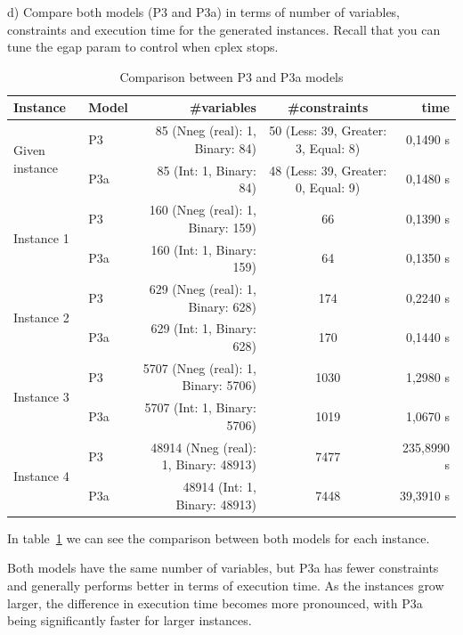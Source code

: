 \documentclass{article}
\begin{document}
\begin{tcolorbox}[colback=gray!10, colframe=gray!50]
d) Compare both models (P3 and P3a) in terms of number of variables, constraints and execution time for the generated instances. Recall that you can tune the egap param to control when cplex stops.
\end{tcolorbox}
\begin{table}[ht]
\centering
\caption{Comparison between P3 and P3a models}
\label{tab:comparation}
\small
\begin{tabular}{l l r c r}
\hline
Instance & Model & \#variables & \#constraints & time \\
\hline
\multirow{2}{*}{Given instance} & P3  & 85 (Nneg (real): 1, Binary: 84)  & 50 (Less: 39, Greater: 3, Equal: 8) & 0,1490 s \\
                                & P3a & 85 (Int: 1, Binary: 84)  & 48 (Less: 39, Greater: 0, Equal: 9) & 0,1480 s \\
\hline
\multirow{2}{*}{Instance 1}     & P3  & 160 (Nneg (real): 1, Binary: 159) & 66 & 0,1390 s \\
                                & P3a & 160 (Int: 1, Binary: 159) & 64 & 0,1350 s \\
\hline
\multirow{2}{*}{Instance 2}     & P3  & 629 (Nneg (real): 1, Binary: 628) & 174 & 0,2240 s \\
                                & P3a & 629 (Int: 1, Binary: 628) & 170 & 0,1440 s \\
\hline
\multirow{2}{*}{Instance 3}     & P3  & 5707 (Nneg (real): 1, Binary: 5706) & 1030 & 1,2980 s \\
                                & P3a & 5707 (Int: 1, Binary: 5706) & 1019 & 1,0670 s \\
\hline
\multirow{2}{*}{Instance 4}     & P3  & 48914 (Nneg (real): 1, Binary: 48913) & 7477 & 235,8990 s \\
                                & P3a & 48914 (Int: 1, Binary: 48913) & 7448 & 39,3910 s \\
\hline

\end{tabular}
\end{table}
\FloatBarrier

In table~\ref{tab:comparation} we can see the comparison between both models for each instance. 

Both models have the same number of variables, but P3a has fewer constraints and generally performs better in terms of execution time.
As the instances grow larger, the difference in execution time becomes more pronounced, with P3a being significantly faster for larger instances.
\end{document}
